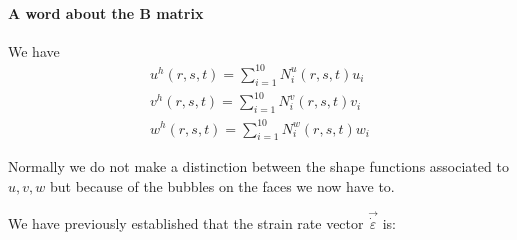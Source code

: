 \paragraph{A word about the ${\bm B}$ matrix} We have  
\begin{eqnarray}
u^h(r,s,t) = \sum_{i=1}^{10} N_i^u(r,s,t) u_i \\
v^h(r,s,t) = \sum_{i=1}^{10} N_i^v(r,s,t) v_i \\
w^h(r,s,t) = \sum_{i=1}^{10} N_i^w(r,s,t) w_i 
\end{eqnarray}

Normally we do not make a distinction between the shape functions 
associated to $u,v,w$ but because of the bubbles on the faces we now have to. 

We have previously established that the strain rate 
vector $\vec{\dot \varepsilon}$ is: 
